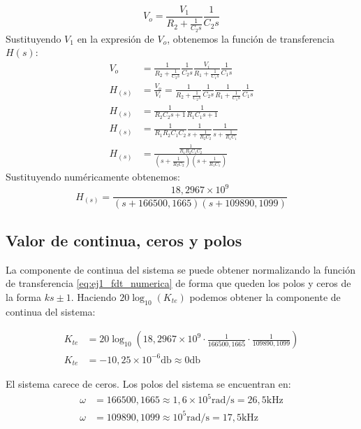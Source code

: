\begin{equation}
    V_o = \frac{V_1}{R_2 + \frac{1}{C_2 s}} \frac{1}{C_2 s}
\end{equation}
Sustituyendo $V_1$ en la expresión de $V_o$, obtenemos la función de transferencia $H(s)$:
{
\allowdisplaybreaks
\begin{align}
    V_o &= \frac{1}{R_2 + \frac{1}{C_2 s}} \frac{1}{C_2 s} \frac{V_i}{R_1 + \frac{1}{C_1 s}} \frac{1}{C_1 s} \nonumber \\[6pt] 
    H_{(s)} &= \frac{V_o}{V_i} = \frac{1}{R_2 + \frac{1}{C_2 s}} \frac{1}{C_2 s} \frac{1}{R_1 + \frac{1}{C_1 s}} \frac{1}{C_1 s} \nonumber \\[6pt]
    H_{(s)} &= \frac{1}{R_2 C_2 s + 1} \frac{1}{R_1 C_1 s + 1} \nonumber \\[6pt]
    H_{(s)} &= \frac{1}{R_1 R_2 C_1 C_2} \frac{1}{s + \frac{1}{R_2 C_2}} \frac{1}{s + \frac{1}{R_1 C_1}} \nonumber \\[6pt]
    H_{(s)} &=  \frac{\frac{1}{R_1 R_2 C_1 C_2}}{\left(s + \frac{1}{R_2 C_2}\right) \left(s + \frac{1}{R_1 C_1}\right)}
    \label{eq:ej1_fdt_simbolica}
\end{align}
}
Sustituyendo numéricamente obtenemos:
\begin{equation}
    H_{(s)} =  \frac{18,2967 \times 10^9}{\left(s + 166500,1665\right) \left(s + 109890,1099\right)}
    \label{eq:ej1_fdt_numerica}
\end{equation}

\subsection{Valor de continua, ceros y polos}

La componente de continua del sistema se puede obtener normalizando la función de transferencia \ref{eq:ej1_fdt_numerica} de
forma que queden los polos y ceros de la forma $ks \pm 1$. Haciendo $20\log_{10}\left(K_{te}\right)$ podemos obtener la
componente de continua del sistema:

\begin{align*}
    K_{te} &= 20 \log_{10}\left(18,2967 \times 10^9 \cdot \frac{1}{166500,1665} \cdot \frac{1}{109890,1099}\right) \\[6pt]
    K_{te} &= -10,25 \times 10^{-6} \si{\decibel} \approx 0 \si{\decibel}
\end{align*}

El sistema carece de ceros. Los polos del sistema se encuentran en:
\begin{align*}
    \omega &= 166500,1665 \approx 1,6 \times 10^5 \si{\radian\per\second} = 26,5 \si{\kilo\hertz} \\[6pt]
    \omega &= 109890,1099 \approx 10^5 \si{\radian\per\second} = 17,5 \si{\kilo\hertz}
\end{align*}



